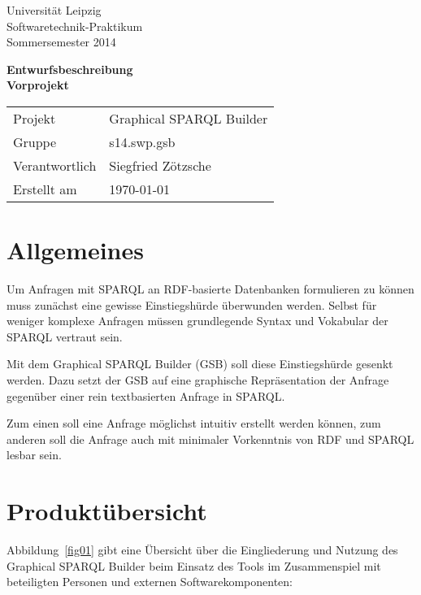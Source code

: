 \def\verantwortlicher{Siegfried Zötzsche} %
\thispagestyle{empty} 

\vspace*{2\baselineskip}

\begin{center}
\sffamily
Universität Leipzig\\
Softwaretechnik-Praktikum\\
Sommersemester 2014
\baselineskip

\bgroup
\Huge\textbf{Entwurfsbeschreibung\\ Vorprojekt}
\egroup
{}\baselineskip

\begin{tabular}{ll}
Projekt & Graphical SPARQL Builder \\
Gruppe & s14.swp.gsb \\
Verantwortlich & \verantwortlicher\\
Erstellt am & \today \\
\end{tabular}
\end{center}

\vfill

\tableofcontents

\pagebreak

\section{Allgemeines}

Um Anfragen mit SPARQL an RDF-basierte Datenbanken formulieren zu
können muss zunächst eine gewisse Einstiegshürde überwunden werden.
Selbst für weniger komplexe Anfragen müssen grundlegende Syntax und
Vokabular der SPARQL vertraut sein.

Mit dem Graphical SPARQL Builder (GSB) soll diese Einstiegshürde gesenkt
werden.
Dazu setzt der GSB auf eine graphische Repräsentation der Anfrage
gegenüber einer rein textbasierten Anfrage in SPARQL.

Zum einen soll eine Anfrage möglichst intuitiv erstellt werden können,
zum anderen soll die Anfrage auch mit minimaler Vorkenntnis von RDF
und SPARQL lesbar sein.

\section{Produktübersicht}

Abbildung~\ref{fig01} gibt eine Übersicht über die Eingliederung und Nutzung des Graphical SPARQL Builder beim Einsatz des Tools im Zusammenspiel mit beteiligten Personen und externen Softwarekomponenten:


